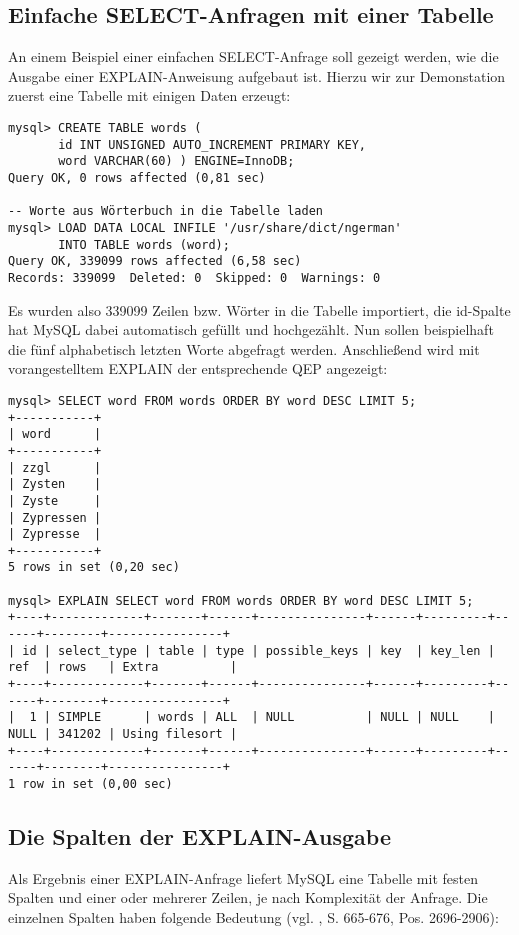 \subsection{Einfache SELECT-Anfragen mit einer Tabelle}
An einem Beispiel einer einfachen SELECT-Anfrage soll gezeigt werden, wie die Ausgabe einer EXPLAIN-Anweisung aufgebaut ist.
Hierzu wir zur Demonstation zuerst eine Tabelle mit einigen Daten erzeugt:
\begin{spacing}{1}\begin{verbatim}
mysql> CREATE TABLE words ( 
       id INT UNSIGNED AUTO_INCREMENT PRIMARY KEY, 
       word VARCHAR(60) ) ENGINE=InnoDB; 
Query OK, 0 rows affected (0,81 sec)

-- Worte aus Wörterbuch in die Tabelle laden
mysql> LOAD DATA LOCAL INFILE '/usr/share/dict/ngerman'
       INTO TABLE words (word);
Query OK, 339099 rows affected (6,58 sec)
Records: 339099  Deleted: 0  Skipped: 0  Warnings: 0
\end{verbatim}\end{spacing}
Es wurden also 339099 Zeilen bzw. Wörter in die Tabelle importiert, die id-Spalte hat MySQL dabei automatisch gefüllt und hochgezählt.
Nun sollen beispielhaft die fünf alphabetisch letzten Worte abgefragt werden. Anschließend wird mit vorangestelltem EXPLAIN der entsprechende QEP angezeigt:
\begin{spacing}{1}
\begin{verbatim}
mysql> SELECT word FROM words ORDER BY word DESC LIMIT 5;
+-----------+
| word      |
+-----------+
| zzgl      |
| Zysten    |
| Zyste     |
| Zypressen |
| Zypresse  |
+-----------+
5 rows in set (0,20 sec)

mysql> EXPLAIN SELECT word FROM words ORDER BY word DESC LIMIT 5;
+----+-------------+-------+------+---------------+------+---------+------+--------+----------------+
| id | select_type | table | type | possible_keys | key  | key_len | ref  | rows   | Extra          |
+----+-------------+-------+------+---------------+------+---------+------+--------+----------------+
|  1 | SIMPLE      | words | ALL  | NULL          | NULL | NULL    | NULL | 341202 | Using filesort |
+----+-------------+-------+------+---------------+------+---------+------+--------+----------------+
1 row in set (0,00 sec)
\end{verbatim}\end{spacing}

\subsection{Die Spalten der EXPLAIN-Ausgabe}
Als Ergebnis einer EXPLAIN-Anfrage liefert MySQL eine Tabelle mit festen Spalten und einer oder mehrerer Zeilen, je nach Komplexität der Anfrage. Die einzelnen Spalten haben folgende Bedeutung (vgl. \cite{refman2}, 
\cite{Schwartz2009} S. 665-676, 
\cite{Bradford2011} Pos. 2696-2906):

